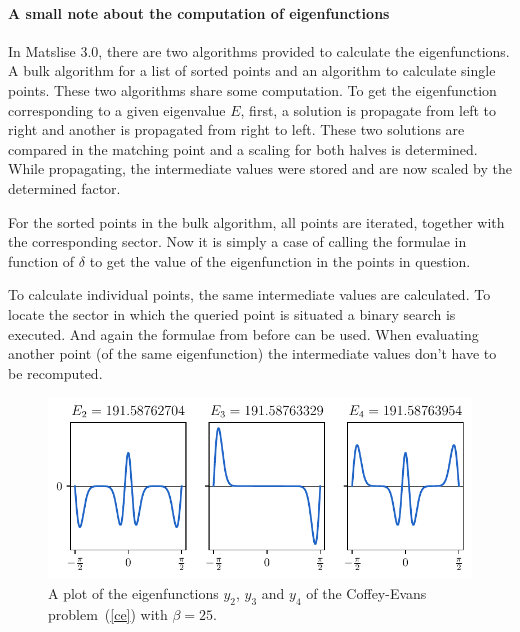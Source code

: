 \paragraph{A small note about the computation of eigenfunctions}

In Matslise 3.0, there are two algorithms provided to calculate the eigenfunctions. A bulk algorithm for a list of sorted points and an algorithm to calculate single points. These two algorithms share some computation. To get the eigenfunction corresponding to a given eigenvalue $E$, first, a solution is propagate from left to right and another is propagated from right to left. These two solutions are compared in the matching point and a scaling for both halves is determined. While propagating, the intermediate values were stored and are now scaled by the determined factor.

For the sorted points in the bulk algorithm, all points are iterated, together with the corresponding sector. Now it is simply a case of calling the formulae in function of $\delta$ to get the value of the eigenfunction in the points in question.

To calculate individual points, the same intermediate values are calculated. To locate the sector in which the queried point is situated a binary search is executed. And again the formulae from before can be used. When evaluating another point (of the same eigenfunction) the intermediate values don't have to be recomputed.

\begin{figure}
  \begin{center}
    \includegraphics[width=1\textwidth]{img/chapter2/pyslise_test/coffey_evans_eigenfunctions.pdf}
  \end{center}
  \caption{\label{ce_fig}A plot of the eigenfunctions $y_2$, $y_3$ and $y_4$ of the Coffey-Evans problem~(\ref{ce}) with $\beta=25$.}
\end{figure}

